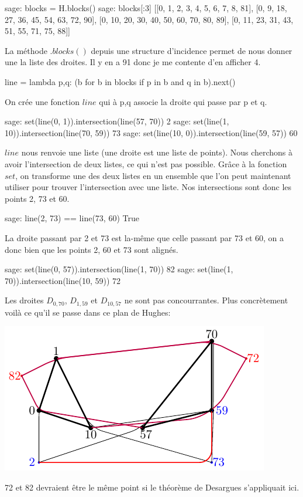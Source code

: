 \documentclass[a4paper]{article}
\begin{document}
\begin{sageverbatim}
 sage: blocks = H.blocks()
 sage: blocks[:3]
 [[0, 1, 2, 3, 4, 5, 6, 7, 8, 81],
 [0, 9, 18, 27, 36, 45, 54, 63, 72, 90],
 [0, 10, 20, 30, 40, 50, 60, 70, 80, 89],
 [0, 11, 23, 31, 43, 51, 55, 71, 75, 88]]
\end{sageverbatim}
La méthode $.blocks()$ depuis une structure d'incidence permet de nous donner une la liste des droites. Il y en a 91 donc je me contente d'en afficher 4.
\begin{sageverbatim}
 line = lambda p,q: (b for b in blocks if p in b and q in b).next()
\end{sageverbatim}
On crée une fonction $line$ qui à p,q associe la droite qui passe par p et q.
\begin{sageverbatim}
 sage: set(line(0, 1)).intersection(line(57, 70))
 {2}
 sage: set(line(1, 10)).intersection(line(70, 59))
 {73}
 sage: set(line(10, 0)).intersection(line(59, 57))
 {60}
\end{sageverbatim}
$line$ nous renvoie une liste (une droite est une liste de points). Nous cherchons à avoir l'intersection de deux listes, ce qui n'est pas possible. Grâce à la fonction $set$, on transforme une des deux listes en un ensemble que l'on peut maintenant utiliser pour trouver l'intersection avec une liste. Nos intersections sont donc les points 2, 73 et 60.
\begin{sageverbatim}
 sage: line(2, 73) == line(73, 60)
 True
\end{sageverbatim}
La droite passant par 2 et 73 est la-même que celle passant par 73 et 60, on a donc bien que les points 2, 60 et 73 sont alignés.
\begin{sageverbatim}
 sage: set(line(0, 57)).intersection(line(1, 70))
 {82}
 sage: set(line(1, 70)).intersection(line(10, 59))
 {72}
\end{sageverbatim}
Les droites $D_{0,70}$, $D_{1,59}$ et $D_{10,57}$ ne sont pas concourrantes.
Plus concrètement voilà ce qu'il se passe dans ce plan de Hughes:
\begin{center}
  \includegraphics[scale=1.5]{Hughestikz.pdf}
\end{center}
72 et 82 devraient être le même point si le théorème de Desargues s'appliquait ici.
\end{document}
